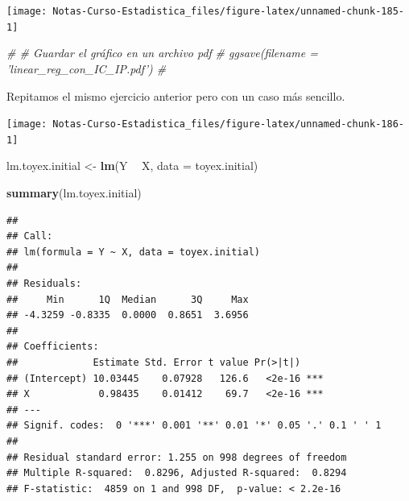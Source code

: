 \documentclass[
  12pt,
]{book}
\newenvironment{Shaded}{\begin{snugshade}}{\end{snugshade}}
\newcommand{\CommentTok}[1]{\textcolor[rgb]{0.56,0.35,0.01}{\textit{#1}}}
\newcommand{\DataTypeTok}[1]{\textcolor[rgb]{0.13,0.29,0.53}{#1}}
\newcommand{\DecValTok}[1]{\textcolor[rgb]{0.00,0.00,0.81}{#1}}
\newcommand{\KeywordTok}[1]{\textcolor[rgb]{0.13,0.29,0.53}{\textbf{#1}}}
\newcommand{\NormalTok}[1]{#1}
\newcommand{\OperatorTok}[1]{\textcolor[rgb]{0.81,0.36,0.00}{\textbf{#1}}}
\newcommand{\StringTok}[1]{\textcolor[rgb]{0.31,0.60,0.02}{#1}}
\theoremstyle{definition}
\theoremstyle{definition}
\theoremstyle{definition}
\theoremstyle{remark}
\begin{document}
\begin{center}\texttt{[image: Notas-Curso-Estadistica\_files/figure-latex/unnamed-chunk-185-1]} \end{center}

\begin{Shaded}
\begin{Highlighting}[]
\CommentTok{# # Guardar el gráfico en un archivo pdf}
\CommentTok{# ggsave(filename = 'linear_reg_con_IC_IP.pdf') #}
\end{Highlighting}
\end{Shaded}

Repitamos el mismo ejercicio anterior pero con un caso más sencillo.

\begin{Shaded}
\end{Shaded}

\begin{center}\texttt{[image: Notas-Curso-Estadistica\_files/figure-latex/unnamed-chunk-186-1]} \end{center}

\begin{Shaded}
\begin{Highlighting}[]
\NormalTok{lm.toyex.initial <-}\StringTok{ }\KeywordTok{lm}\NormalTok{(Y }\OperatorTok{~}\StringTok{ }\NormalTok{X, }\DataTypeTok{data =}\NormalTok{ toyex.initial)}

\KeywordTok{summary}\NormalTok{(lm.toyex.initial)}
\end{Highlighting}
\end{Shaded}

\begin{verbatim}
## 
## Call:
## lm(formula = Y ~ X, data = toyex.initial)
## 
## Residuals:
##     Min      1Q  Median      3Q     Max 
## -4.3259 -0.8335  0.0000  0.8651  3.6956 
## 
## Coefficients:
##             Estimate Std. Error t value Pr(>|t|)    
## (Intercept) 10.03445    0.07928   126.6   <2e-16 ***
## X            0.98435    0.01412    69.7   <2e-16 ***
## ---
## Signif. codes:  0 '***' 0.001 '**' 0.01 '*' 0.05 '.' 0.1 ' ' 1
## 
## Residual standard error: 1.255 on 998 degrees of freedom
## Multiple R-squared:  0.8296, Adjusted R-squared:  0.8294 
## F-statistic:  4859 on 1 and 998 DF,  p-value: < 2.2e-16
\end{verbatim}
\end{document}
